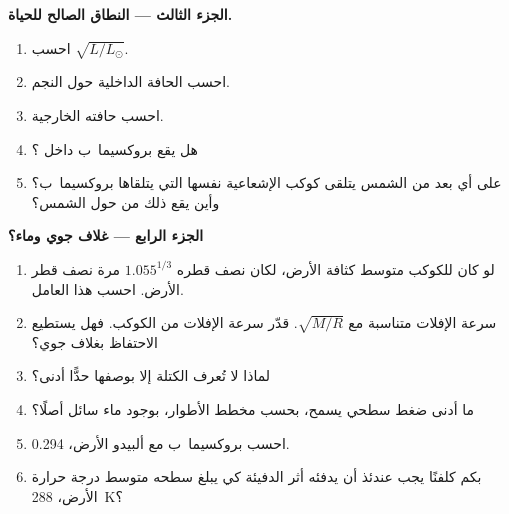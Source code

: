 \begin{problem}
\medskip
\noindent\textbf{الجزء الثالث --- النطاق الصالح للحياة.}
\begin{enumerate}[resume]
  \item احسب $\sqrt{L/L_\odot}$.
  \item احسب الحافة الداخلية  حول النجم.
  \item احسب حافته الخارجية.
  \item هل يقع بروكسيما~ب داخل ؟
  \item على أي بعد من الشمس يتلقى كوكب الإشعاعية نفسها التي يتلقاها
        بروكسيما~ب؟ وأين يقع ذلك من  حول
        الشمس؟
\end{enumerate}

\medskip
\noindent\textbf{الجزء الرابع --- غلاف جوي وماء؟}
\begin{enumerate}[resume]
  \item لو كان للكوكب متوسط كثافة الأرض، لكان نصف قطره
        $1.055^{1/3}$ مرة نصف قطر الأرض. احسب هذا العامل.
  \item سرعة الإفلات متناسبة مع $\sqrt{M/R}$. قدّر سرعة الإفلات من
        الكوكب. فهل يستطيع الاحتفاظ بغلاف جوي؟
  \item لماذا لا تُعرف الكتلة إلا بوصفها حدًّا أدنى؟
  \item ما أدنى ضغط سطحي يسمح، بحسب مخطط الأطوار، بوجود ماء سائل
        أصلًا؟
  \item احسب  بروكسيما~ب مع ألبيدو الأرض،
        0.294.
  \item بكم كلفنًا يجب عندئذ أن يدفئه أثر الدفيئة كي يبلغ سطحه متوسط درجة
        حرارة الأرض،
        \qty{288}{K}؟
\end{enumerate}
\end{problem}
